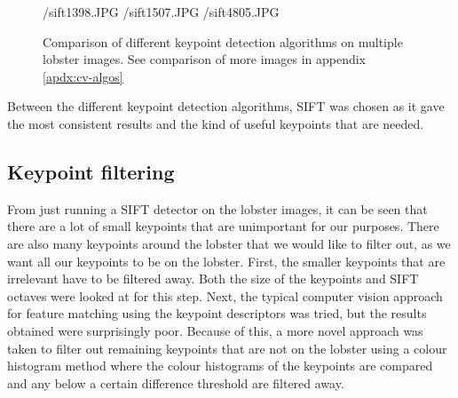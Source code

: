 \begin{figure}[H]
\centering
\threefig
{\imgpath/sift1398.JPG}{}
{\imgpath/sift1507.JPG}{}
{\imgpath/sift4805.JPG}{}
	
	
\vspace{0.5cm}

	\begin{subfigure}{0.31\textwidth}

	\end{subfigure}
	\hspace*{\fill}
	\begin{subfigure}{0.31\textwidth}

	\end{subfigure}
	\hspace*{\fill}
	\begin{subfigure}{0.31\textwidth}

	\end{subfigure}
	
\vspace{0.5cm}

	\begin{subfigure}{0.31\textwidth}

	\end{subfigure}
	\hspace*{\fill}
	\begin{subfigure}{0.31\textwidth}

	\end{subfigure}
	\hspace*{\fill}
	\begin{subfigure}{0.31\textwidth}

	\end{subfigure}

\caption{Comparison of different keypoint detection algorithms on multiple lobster images. See comparison of more images in appendix \ref{apdx:cv-algos}}
\end{figure}
\noindent

Between the different keypoint detection algorithms, SIFT was chosen as it gave the most consistent results and the kind of useful keypoints that are needed.


\subsection{Keypoint filtering}\label{sec:kp-filter}
From just running a SIFT detector on the lobster images, it can be seen that there are a lot of small keypoints that are unimportant for our purposes. There are also many keypoints around the lobster that we would like to filter out, as we want all our keypoints to be on the lobster. First, the smaller keypoints that are irrelevant have to be filtered away. Both the size of the keypoints and SIFT octaves were looked at for this step. Next, the typical computer vision approach for feature matching using the keypoint descriptors \cite{sift} was tried, but the results obtained were surprisingly poor. Because of this, a more novel approach was taken to filter out remaining keypoints that are not on the lobster using a colour histogram method where the colour histograms of the keypoints are compared and any below a certain difference threshold are filtered away.

